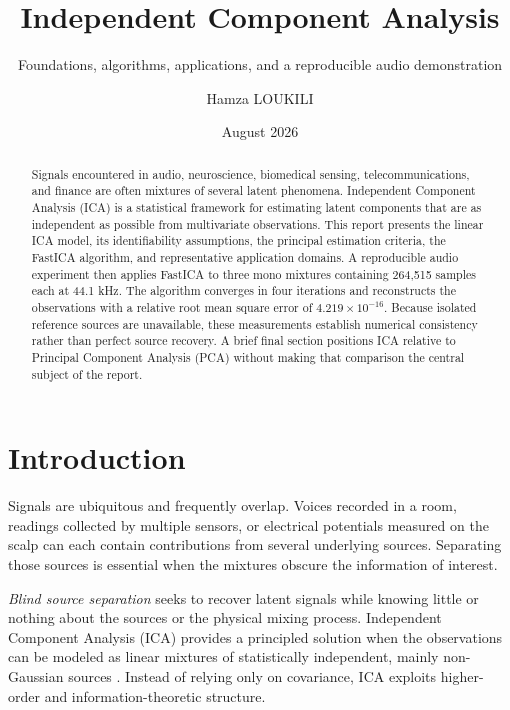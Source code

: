 \documentclass[
    paper=a4,
    fontsize=11pt,
    DIV=11,
    parskip=half,
    headings=normal,
    numbers=noendperiod,
    abstract=true,
    titlepage=true
]{scrartcl}
\title{Independent Component Analysis}
\subtitle{Foundations, algorithms, applications, and a reproducible audio demonstration}
\author{Hamza LOUKILI}
\date{August 2026}
\begin{document}
\hypersetup{pageanchor=false}
\maketitle
\hypersetup{pageanchor=true}

\begin{abstract}
Signals encountered in audio, neuroscience, biomedical sensing, telecommunications, and finance are often mixtures of several latent phenomena. Independent Component Analysis (ICA) is a statistical framework for estimating latent components that are as independent as possible from multivariate observations. This report presents the linear ICA model, its identifiability assumptions, the principal estimation criteria, the FastICA algorithm, and representative application domains. A reproducible audio experiment then applies FastICA to three mono mixtures containing 264,515 samples each at 44.1 kHz. The algorithm converges in four iterations and reconstructs the observations with a relative root mean square error of $4.219\times10^{-16}$. Because isolated reference sources are unavailable, these measurements establish numerical consistency rather than perfect source recovery. A brief final section positions ICA relative to Principal Component Analysis (PCA) without making that comparison the central subject of the report.
\end{abstract}

\tableofcontents
\listoffigures
\newpage
{}

\section{Introduction}

Signals are ubiquitous and frequently overlap. Voices recorded in a room, readings collected by multiple sensors, or electrical potentials measured on the scalp can each contain contributions from several underlying sources. Separating those sources is essential when the mixtures obscure the information of interest.

\emph{Blind source separation} seeks to recover latent signals while knowing little or nothing about the sources or the physical mixing process. Independent Component Analysis (ICA) provides a principled solution when the observations can be modeled as linear mixtures of statistically independent, mainly non-Gaussian sources \cite{comon1994,hyvarinen2000}. Instead of relying only on covariance, ICA exploits higher-order and information-theoretic structure.
\end{document}
